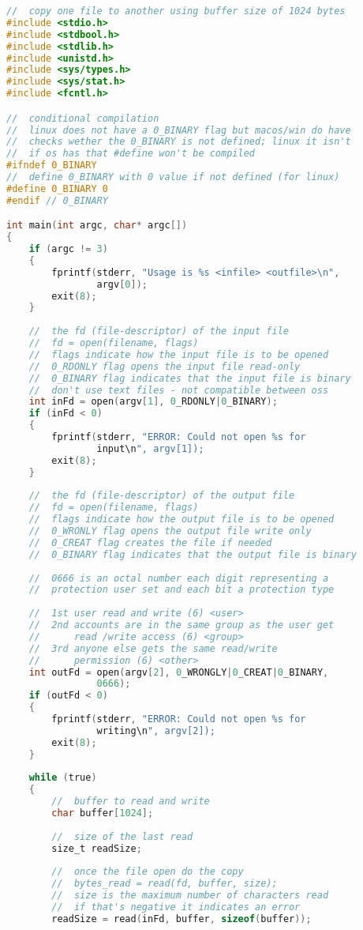 \documentclass[8pt]{extarticle}
\begin{document}
\begin{small}
\begin{multicols}{2}
\begin{lstlisting}[language=C]
//  copy one file to another using buffer size of 1024 bytes
#include <stdio.h>
#include <stdbool.h>
#include <stdlib.h>
#include <unistd.h>
#include <sys/types.h>
#include <sys/stat.h>
#include <fcntl.h>

//  conditional compilation
//  linux does not have a 0_BINARY flag but macos/win do have
//  checks wether the 0_BINARY is not defined; linux it isn't
//  if os has that #define won't be compiled
#ifndef 0_BINARY
//  define 0_BINARY with 0 value if not defined (for linux)
#define 0_BINARY 0
#endif // 0_BINARY

int main(int argc, char* argc[])
{
	if (argc != 3) 
	{
		fprintf(stderr, "Usage is %s <infile> <outfile>\n", 
				argv[0]);
		exit(8);
	}
	
	//  the fd (file-descriptor) of the input file
	//  fd = open(filename, flags)
	//  flags indicate how the input file is to be opened
	//  0_RDONLY flag opens the input file read-only
	//  0_BINARY flag indicates that the input file is binary
	//  don't use text files - not compatible between oss
	int inFd = open(argv[1], 0_RDONLY|0_BINARY);
	if (inFd < 0)
	{
		fprintf(stderr, "ERROR: Could not open %s for 
				input\n", argv[1]);
		exit(8);
	}
	
	//  the fd (file-descriptor) of the output file
	//  fd = open(filename, flags)
	//  flags indicate how the output file is to be opened
	//  0_WRONLY flag opens the output file write only
	//  0_CREAT flag creates the file if needed
	//  0_BINARY flag indicates that the output file is binary
	
	//  0666 is an octal number each digit representing a 
	//  protection user set and each bit a protection type
	
	//  1st user read and write (6) <user>
	//  2nd accounts are in the same group as the user get 
	//      read /write access (6) <group>
	//  3rd anyone else gets the same read/write 
	//      permission (6) <other>
	int outFd = open(argv[2], 0_WRONGLY|0_CREAT|0_BINARY, 
				0666);
	if (outFd < 0)
	{
		fprintf(stderr, "ERROR: Could not open %s for 
				writing\n", argv[2]);
		exit(8);
	}
	
	while (true)
	{
		//  buffer to read and write
		char buffer[1024];
		
		//  size of the last read
		size_t readSize;
		
		//  once the file open do the copy
		//  bytes_read = read(fd, buffer, size);
		//  size is the maximum number of characters read
		//  if that's negative it indicates an error
		readSize = read(inFd, buffer, sizeof(buffer));
		

\end{lstlisting}
\end{multicols}
\end{small}
\end{document}
